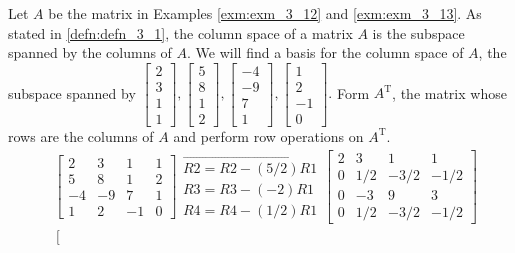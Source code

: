 \documentclass[../main.tex]{subfiles}
\begin{document}
\begin{example}\label{exm:exm_3_14}  Let $A$ be the matrix in Examples \ref{exm:exm_3_12} and \ref{exm:exm_3_13}. As stated in \autoref{defn:defn_3_1}, the column space of a matrix $A$ is the subspace spanned by the columns of $A$. We will find a basis for the column space of $A$, the subspace spanned by $\left[\begin{array}{l}2 \\ 3 \\ 1 \\ 1\end{array}\right],\left[\begin{array}{l}5 \\ 8 \\ 1 \\ 2\end{array}\right],\left[\begin{array}{c}-4 \\ -9 \\ 7 \\ 1\end{array}\right],\left[\begin{array}{c}1 \\ 2 \\ -1 \\ 0\end{array}\right] .$ Form $A^{\mathrm{T}}$, the matrix whose rows are the columns of $A$ and perform row operations on $A^{\mathrm{T}}$.
$$
\begin{aligned}
&{\left[\begin{array}{cccc}
	2 & 3 & 1 & 1 \\
	5 & 8 & 1 & 2 \\
	-4 & -9 & 7 & 1 \\
	1 & 2 & -1 & 0
\end{array}\right] \begin{array}{r}
	\overrightarrow{R 2=R 2-(5 / 2) R 1} \\
	R 3=R 3-(-2) R 1 \\
	R 4=R 4-(1 / 2) R 1
\end{array}\left[\begin{array}{cccc}
	2 & 3 & 1 & 1 \\
	0 & 1 / 2 & -3 / 2 & -1 / 2 \\
	0 & -3 & 9 & 3 \\
	0 & 1 / 2 & -3 / 2 & -1 / 2
	\end{array}\right]} \\
&\left[\begin{array}{cccc}

\end{array}
\end{aligned}$$
\end{example}
\end{document}
